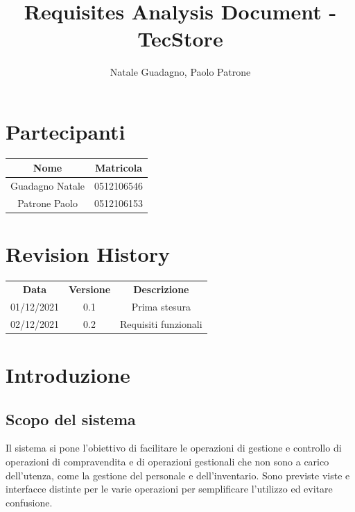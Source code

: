 \documentclass[12pt,a4paper]{article}
\author{Natale Guadagno, Paolo Patrone}
\title{Requisites Analysis Document - TecStore}
\begin{document}
\maketitle
\newpage
\tableofcontents
\newpage
{}
\section*{Partecipanti}
\begin{center}
\begin{tabular} {|c|c|}
\hline
\textbf{Nome} & \textbf{Matricola} \\
\hline
Guadagno Natale & 0512106546 \\
Patrone Paolo & 0512106153 \\
\hline
\end{tabular}
\end{center}


\section*{Revision History}
\begin{center}
\begin{tabular} {|c|c|c|}
\hline
\textbf{Data} & \textbf{Versione} & \textbf{Descrizione} \\
01/12/2021 & 0.1 & Prima stesura \\
02/12/2021 & 0.2 & Requisiti funzionali \\
\hline

\hline
\end{tabular}
\end{center}

\newpage

\section{Introduzione}

\subsection{Scopo del sistema}
Il sistema si pone l'obiettivo di facilitare le operazioni di gestione e controllo di operazioni di compravendita e di operazioni gestionali che non sono a carico dell'utenza, come la gestione del personale e dell'inventario. Sono previste viste e interfacce distinte per le varie operazioni per semplificare l'utilizzo ed evitare confusione.
\end{document}
